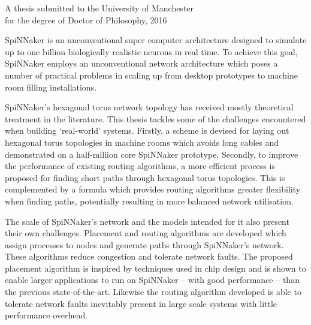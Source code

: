 {
	
	
	
	\vfill
	
	\begin{center}
		\textsc{\large\thesistitle}
		
		\vspace{0.5em}
		
		\thesisauthor
		
		\vspace{0.5em}
		
		A thesis submitted to the University of Manchester\\
		for the degree of Doctor of Philosophy, 2016
	\end{center}
	
	\vfill
	
	
	SpiNNaker is an unconventional super computer architecture designed to
	simulate up to one billion biologically realistic neurons in real time. To
	achieve this goal, SpiNNaker employs an unconventional network architecture
	which poses a number of practical problems in scaling up from desktop
	prototypes to machine room filling installations.
	
	SpiNNaker's hexagonal torus network topology has received mostly theoretical
	treatment in the literature. This thesis tackles some of the challenges
	encountered when building `real-world' systems.  Firstly, a scheme is devised
	for laying out hexagonal torus topologies in machine rooms which avoids long
	cables and demonstrated on a half-million core SpiNNaker prototype. Secondly,
	to improve the performance of existing routing algorithms, a more efficient
	process is proposed for finding short paths through hexagonal torus
	topologies. This is complemented by a formula which provides routing
	algorithms greater flexibility when finding paths, potentially resulting in
	more balanced network utilisation.
	
	The scale of SpiNNaker's network and the models intended for it also present
	their own challenges. Placement and routing algorithms are developed which
	assign processes to nodes and generate paths through SpiNNaker's network.
	These algorithms reduce congestion and tolerate network faults. The proposed
	placement algorithm is inspired by techniques used in chip design and is
	shown to enable larger applications to run on SpiNNaker -- with good
	performance -- than the previous state-of-the-art. Likewise the routing
	algorithm developed is able to tolerate network faults inevitably present in
	large scale systems with little performance overhead.
	
	
	\par%
}
